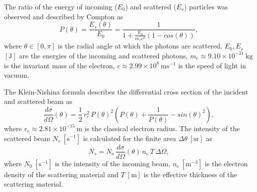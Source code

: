 \documentclass[a4paper,12pt,titlepage, twoside]{article}
\newcommand{\unit}[2]{$#1~\ensuremath{\mathrm{#2}}$}
\begin{document}

The ratio of the energy of incoming ($E_{0}$) and scattered ($E_{s}$) particles was observed and described by Compton as
\begin{equation}
  P\left(\theta\right) = \frac{E_{s}\left(\theta\right)}{E_{0}} = \frac{1}{1 + \frac{E_0}{m_ec^2}\left(1 - cos\left(\theta\right)\right)},
\end{equation}
where $\theta \in \left[0, \pi\right]$ is the radial angle at which the photons are scattered, $E_0, E_s$ $\left[\mathrm{J}\right]$ are the energies of the incoming and scattered photons, \unit{m_e \approx 9.10 \times 10^{-31}}{kg} is the invariant mass of the electron, \unit{c \approx 2.99 \times 10^{8}}{ms^{-1}} is the speed of light in vacuum.

The Klein-Nishina formula \cite{leo2012techniques} describes the differential cross section of the incident and scattered beam as
\begin{equation}
  \frac{d\sigma}{d\Omega}\left(\theta\right) = \frac{1}{2}\,r_{e}^2\,P\left(\theta\right)^2\left(P\left(\theta\right) + \frac{1}{P\left(\theta\right)} - sin\left(\theta\right)^2\right),
\end{equation}
where \unit{r_e \approx 2.81 \times 10^{-15}}{m} is the classical electron radius.
The intensity of the scattered beam \unit{N_s}{\left[s^{-1}\right]} is calculated for the finite area \unit{\Delta \theta}{\left[sr\right]} as
\begin{equation}
  N_s = N_o\,\frac{d\sigma}{d\Omega}\left(\theta\right)\,n_e\,T\,\Delta\Omega,
\end{equation}
where \unit{N_0}{\left[s^{-1}\right]} is the intensity of the incoming beam, \unit{n_e}{\left[m^{-3}\right]} is the electron density of the scattering material and \unit{T}{\left[m\right]} is the effective thickness of the scattering material.
\end{document}
